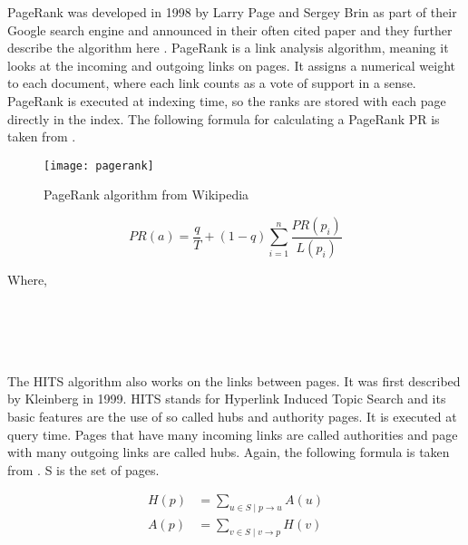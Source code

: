 PageRank was developed in 1998 by Larry Page and Sergey Brin as part of their Google search engine and announced in their often cited paper \citep{Brin1998b} and they further describe the algorithm here \citep{Brin1998}. PageRank is a link analysis algorithm, meaning it looks at the incoming and outgoing links on pages. It assigns a numerical weight to each document, where each link counts as a vote of support in a sense. PageRank is executed at indexing time, so the ranks are stored with each page directly in the index. The following formula for calculating a PageRank PR is taken from \citep[p.472]{Baeza-Yates2011}.

\begin{figure}[htb] %
  \centering
  \texttt{[image: pagerank]}
\caption[PageRank algorithm]{PageRank algorithm from Wikipedia}
\label{fig:pagerank}
\end{figure}

\begin{equation}
  PR(a) =
  \frac{q}{T} + (1 - q)
  \sum_{i=1}^{n} \frac{PR(p_i)}{L(p_i)}
  \label{eq:PR}
\end{equation}

Where,\\
 \\
 \\
 \\
 \\
\itab{} 

The HITS algorithm also works on the links between pages. It was first described by Kleinberg \citep[p.472]{Kleinberg1999, Kleinberg} in 1999. HITS stands for Hyperlink Induced Topic Search and its basic features are the use of so called hubs and authority pages. It is executed at query time. Pages that have many incoming links are called authorities and page with many outgoing links are called hubs. Again, the following formula is taken from \citep[p.471]{Baeza-Yates2011}. S is the set of pages.

\begin{equation}
  \begin{split}
  H(p) &= \sum_{u\in S \mid p\to u}A(u)\\
  A(p) &= \sum_{v\in S \mid v\to p}H(v)
  \end{split}
  \label{eq:HITS}
\end{equation}

